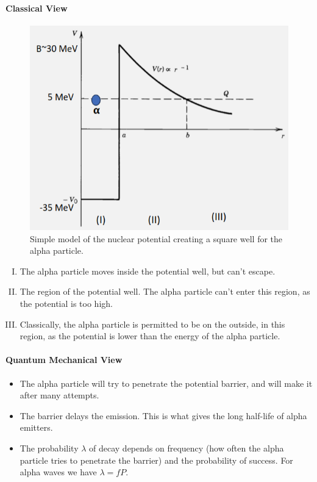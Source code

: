 \parbox[t]{\dimexpr\textwidth-\leftmargin}{%
\paragraph{Classical View}
\begin{figure}
\vspace{3mm}
\centering
\includegraphics[width = .4\textwidth]{alpha_square_well.png}
\caption{Simple model of the nuclear potential creating a square well for the alpha particle. }
\label{fig: alpha_square_well}
\end{figure}
\begin{enumerate}[(I)]
  \item The alpha particle moves inside the potential well, but can't escape. 
  \item The region of the potential well. The alpha particle can't enter this region, as the potential is too high.
  \item Classically, the alpha particle is permitted to be on the outside, in this region, as the potential is lower than the energy of the alpha particle.
\end{enumerate}
\vspace{5mm}
}
  
  
\paragraph{Quantum Mechanical View}
\begin{itemize}
  \item The alpha particle will try to penetrate the potential barrier, and will make it after many attempts. 
  \item The barrier delays the emission. This is what gives the long half-life of alpha emitters. 
  \item The probability $λ$ of decay depends on frequency (how often the alpha particle tries to penetrate the barrier) and the probability of success. For alpha waves we have $λ = fP$. 
\end{itemize}

